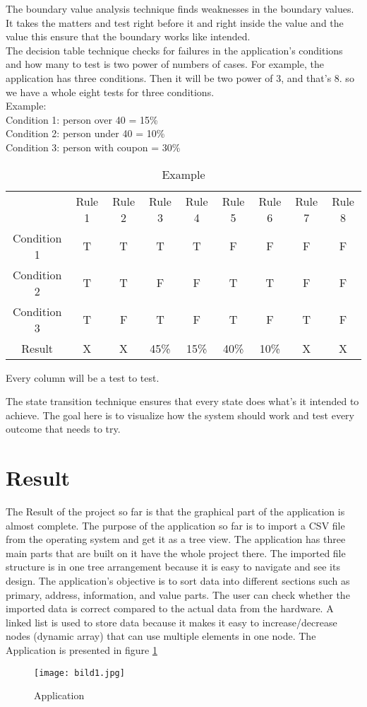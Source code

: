 \documentclass{article}
\begin{document}
The boundary value analysis technique finds weaknesses in the boundary values. It takes the matters and test right before it and right inside the value and the value this ensure that the boundary works like intended.\\

The decision table technique checks for failures in the application's conditions and how many to test is two power of numbers of cases. For example, the application has three conditions. Then it will be two power of 3, and that's 8. so we have a whole eight tests for three conditions. \\
Example:\\ 
Condition 1: person over 40 = 15\%\\
Condition 2: person under 40 = 10\%\\
Condition 3: person with coupon = 30\%\\
\begin{table}[h!]
    \centering
    \begin{tabular}{c|c|c|c|c|c|c|c|c|}
        &Rule 1&Rule 2&Rule 3&Rule 4&Rule 5&Rule 6&Rule 7&Rule 8  \\
        Condition 1&T&T&T&T&F&F&F&F\\
        Condition 2&T&T&F&F&T&T&F&F\\
        Condition 3&T&F&T&F&T&F&T&F\\
        Result&X&X&45\%&15\%&40\%&10\%&X&X\\
        
    \end{tabular}
    \caption{Example}
    \label{tab:my_label}
\end{table}
Every column will be a test to test.

The state transition technique ensures that every state does what's it intended to achieve. The goal here is to visualize how the system should work and test every outcome that needs to try.
\section{Result}
The Result of the project so far is that the graphical part of the application is almost complete. The purpose of the application so far is to import a CSV file from the operating system and get it as a tree view. The application has three main parts that are built on it have the whole project there. The imported file structure is in one tree arrangement because it is easy to navigate and see its design. The application's objective is to sort data into different sections such as primary, address, information, and value parts. The user can check whether the imported data is correct compared to the actual data from the hardware. A linked list is used to store data because it makes it easy to increase/decrease nodes (dynamic array) that can use multiple elements in one node. The Application is presented in figure \ref{fig:application}
\begin{figure}[h!]
    \centering
    \texttt{[image: bild1.jpg]}
    \caption{Application}
    \label{fig:application}
\end{figure}
\newpage
\end{document}
